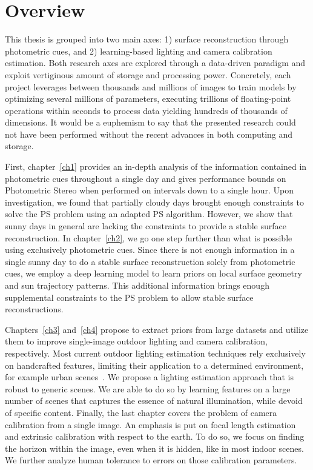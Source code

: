 \section*{Overview}

This thesis is grouped into two main axes: 1) surface reconstruction through photometric cues, and 2) learning-based lighting and camera calibration estimation. Both research axes are explored through a data-driven paradigm and exploit vertiginous amount of storage and processing power. Concretely, each project leverages between thousands and millions of images to train models by optimizing several millions of parameters, executing trillions of floating-point operations within seconds to process data yielding hundreds of thousands of dimensions. It would be a euphemism to say that the presented research could not have been performed without the recent advances in both computing and storage.

First, chapter~\ref{ch1} provides an in-depth analysis of the information contained in photometric cues throughout a single day and gives performance bounds on Photometric Stereo when performed on intervals down to a single hour. Upon investigation, we found that partially cloudy days brought enough constraints to solve the PS problem using an adapted PS algorithm. However, we show that sunny days in general are lacking the constraints to provide a stable surface reconstruction. In chapter~\ref{ch2}, we go one step further than what is possible using exclusively photometric cues. Since there is not enough information in a single sunny day to do a stable surface reconstruction solely from photometric cues, we employ a deep learning model to learn priors on local surface geometry and sun trajectory patterns. This additional information brings enough supplemental constraints to the PS problem to allow stable surface reconstructions.

Chapters~\ref{ch3} and~\ref{ch4} propose to extract priors from large datasets and utilize them to improve single-image outdoor lighting and camera calibration, respectively. Most current outdoor lighting estimation techniques rely exclusively on handcrafted features, limiting their application to a determined environment, for example urban scenes~\cite{lalonde-ijcv-12}. We propose a lighting estimation approach that is robust to generic scenes. We are able to do so by learning features on a large number of scenes that captures the essence of natural illumination, while devoid of specific content. Finally, the last chapter covers the problem of camera calibration from a single image. An emphasis is put on focal length estimation and extrinsic calibration with respect to the earth. To do so, we focus on finding the horizon within the image, even when it is hidden, like in most indoor scenes. We further analyze human tolerance to errors on those calibration parameters.



%
%

